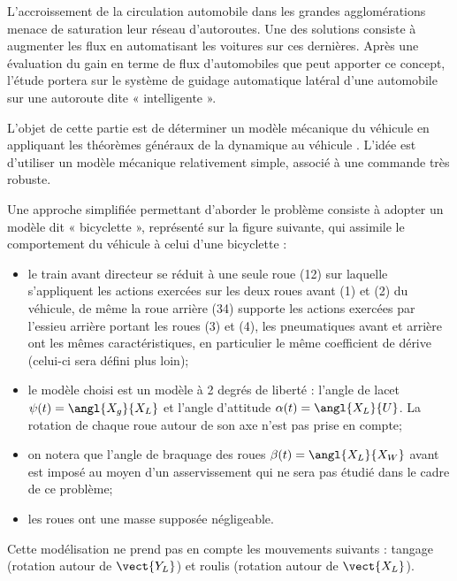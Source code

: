 \def\columnseprulecolor{\color{ocre}}
\setlength{\columnseprule}{0.4pt} 


\setcounter{exo}{0}


\ifprof
\else
\begin{multicols}{2}
\fi


\ifprof
\else
L'accroissement de la circulation automobile dans les grandes agglomérations
menace de saturation leur réseau d'autoroutes. Une des solutions consiste à
augmenter les flux en automatisant les voitures sur ces dernières. Après une
évaluation du gain en terme de flux d'automobiles que peut apporter ce concept,
l'étude portera sur le système de guidage automatique latéral d'une automobile
sur une autoroute dite « intelligente ».
\fi


\begin{obj}
L'objet de cette partie est de déterminer un modèle mécanique du véhicule en
appliquant les théorèmes généraux de la dynamique au véhicule . L'idée est
d'utiliser un modèle mécanique relativement simple, associé à une commande
très robuste.
\end{obj}



\ifprof
\else
Une approche simplifiée permettant d'aborder le problème consiste à adopter un
modèle dit « bicyclette », représenté sur la figure suivante, qui assimile le comportement
du véhicule à celui d'une bicyclette :
\begin{itemize}
\item le train avant directeur se réduit à une seule roue (12) sur laquelle s’appliquent
les actions exercées sur les deux roues avant (1) et (2) du véhicule, de
même la roue arrière (34) supporte les actions exercées par l’essieu arrière
portant les roues (3) et (4), les pneumatiques avant et arrière
ont les mêmes caractéristiques, en particulier le même coefficient de dérive
(celui-ci sera défini plus loin);
\item le modèle choisi est un modèle à 2 degrés de liberté : l’angle de lacet
$\psi(t)=\angl{X_g}{X_L}$ et l’angle d’attitude $\alpha(t)=\angl{X_L}{U}$. La rotation de chaque
roue autour de son axe n’est pas prise en compte;
\item on notera que l’angle de braquage des roues $\beta(t)=\angl{X_L}{X_W}$ avant est
imposé au moyen d’un asservissement qui ne sera pas étudié dans le cadre
de ce problème;
\item les roues ont une masse supposée négligeable.
\end{itemize}
Cette modélisation ne prend pas en compte les mouvements suivants : tangage
(rotation autour de $\vect{Y_L}$) et roulis (rotation autour de $\vect{X_L}$).




\end{multicols}
